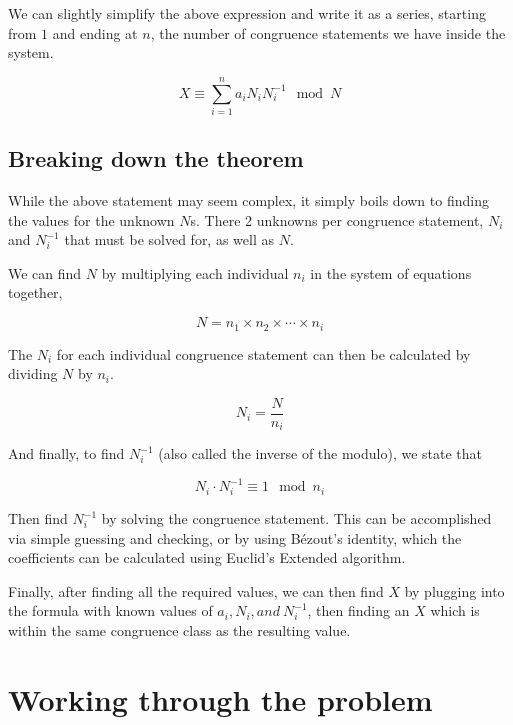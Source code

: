 \documentclass[index]{subfiles}
\begin{document}
We can slightly simplify the above expression and write it as a series, starting from \(1\) and ending at \(n\), the number of congruence statements we have inside the system. 

\begin{equation*}
    X\equiv \sum_{i=1}^{n}a_{i}N_{i}N_{i}^{-1}\mod N
\end{equation*}

\subsection{Breaking down the theorem}

While the above statement may seem complex, it simply boils down to finding the values for the unknown \(N\)s. There 2 unknowns per congruence statement, \(N_i\) and \(N_i^{-1}\) that must be solved for, as well as \(N\).

We can find \(N\) by multiplying each individual \(n_i\) in the system of equations together,

\begin{equation*}
    N=n_1\times n_2 \times \cdots \times n_i
\end{equation*}

The \(N_i\) for each individual congruence statement can then be calculated by dividing \(N\) by \(n_i\).

\begin{equation*}
    N_i=\frac{N}{n_i}
\end{equation*}

And finally, to find \(N_i^{-1}\) (also called the inverse of the modulo), we state that

\begin{equation*}
    N_i\cdot N_i^{-1}\equiv 1 \mod n_i
\end{equation*}

Then find \(N_i^{-1}\) by solving the congruence statement. This can be accomplished via simple guessing and checking, or by using Bézout's identity, which the coefficients can be calculated using Euclid's Extended algorithm.

Finally, after finding all the required values, we can then find \(X\) by plugging into the formula with known values of \(a_{i}, N_{i}, and\ N_{i}^{-1}\), then finding an \(X\) which is within the same congruence class as the resulting value.

\section{Working through the problem}
\end{document}
